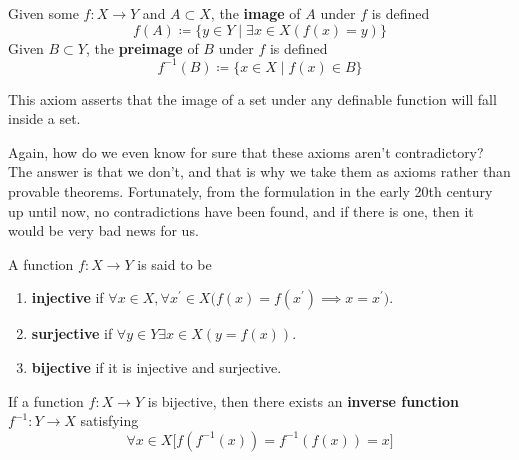 \documentclass{article}
\begin{document}
    \begin{definition}
      Given some $f: X \rightarrow Y$ and $A \subset X$, the \textbf{image} of $A$ under $f$ is defined 
      \begin{equation}
        f(A) \coloneqq \{y \in Y \mid \exists x \in X (f(x) = y)\}
      \end{equation}
      Given $B \subset Y$, the \textbf{preimage} of $B$ under $f$ is defined 
      \begin{equation}
        f^{-1} (B) \coloneqq \{ x \in X \mid f(x) \in B \}
      \end{equation}
    \end{definition} 

    \begin{axiom}
      This axiom asserts that the image of a set under any definable function will fall inside a set. 
    \end{axiom} 

    Again, how do we even know for sure that these axioms aren't contradictory? The answer is that we don't, and that is why we take them as axioms rather than provable theorems. Fortunately, from the formulation in the early 20th century up until now, no contradictions have been found, and if there is one, then it would be very bad news for us.  

    \begin{definition}
      A function $f: X \rightarrow Y$ is said to be 
      \begin{enumerate}
        \item \textbf{injective} if $\forall x \in X, \forall x^\prime \in X \big( f(x) = f(x^\prime) \implies x = x^\prime \big)$. 
        \item \textbf{surjective} if $\forall y \in Y \exists x \in X (y = f(x))$. 
        \item \textbf{bijective} if it is injective and surjective. 
      \end{enumerate}
    \end{definition}

    \begin{definition}
      If a function $f: X \rightarrow Y$ is bijective, then there exists an \textbf{inverse function} $f^{-1}: Y \rightarrow X$ satisfying 
      \begin{equation}
        \forall x \in X \big[ f(f^{-1}(x)) = f^{-1} (f(x)) = x \big]
      \end{equation}
    \end{definition} 
\end{document}
